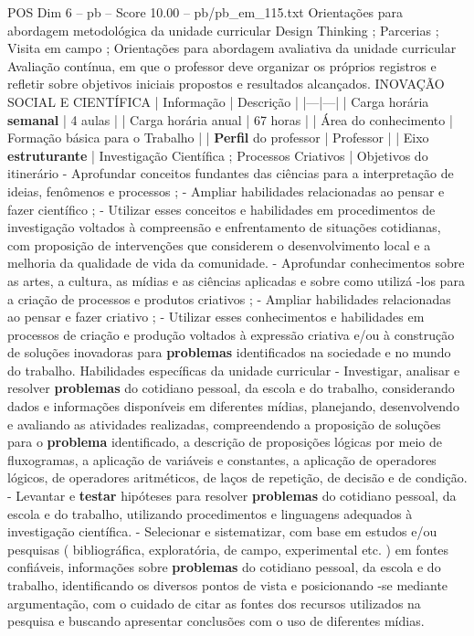 \begin{textsample}{POS Dim 6 – pb – Score 10.00 – pb/pb\_em\_115.txt}
Orientações para abordagem metodológica da unidade curricular Design Thinking ; Parcerias ; Visita em campo ; Orientações para abordagem avaliativa da unidade curricular Avaliação contínua, em que o professor deve organizar os próprios registros e refletir sobre objetivos iniciais propostos e resultados alcançados.
INOVAÇÃO SOCIAL E CIENTÍFICA | Informação | Descrição | |---|---| | Carga horária \textbf{semanal} | 4 aulas | | Carga horária anual | 67 horas | | Área do conhecimento | Formação básica para o Trabalho | | \textbf{Perfil} do professor | Professor | | Eixo \textbf{estruturante} | Investigação Científica ; Processos Criativos | Objetivos do itinerário - Aprofundar conceitos fundantes das ciências para a interpretação de ideias, fenômenos e processos ; - Ampliar habilidades relacionadas ao pensar e fazer científico ; - Utilizar esses conceitos e habilidades em procedimentos de investigação voltados à compreensão e enfrentamento de situações cotidianas, com proposição de intervenções que considerem o desenvolvimento local e a melhoria da qualidade de vida da comunidade. - Aprofundar conhecimentos sobre as artes, a cultura, as mídias e as ciências aplicadas e sobre como utilizá -los para a criação de processos e produtos criativos ; - Ampliar habilidades relacionadas ao pensar e fazer criativo ; - Utilizar esses conhecimentos e habilidades em processos de criação e produção voltados à expressão criativa e/ou à construção de soluções inovadoras para \textbf{problemas} identificados na sociedade e no mundo do trabalho.
Habilidades específicas da unidade curricular - Investigar, analisar e resolver \textbf{problemas} do cotidiano pessoal, da escola e do trabalho, considerando dados e informações disponíveis em diferentes mídias, planejando, desenvolvendo e avaliando as atividades realizadas, compreendendo a proposição de soluções para o \textbf{problema} identificado, a descrição de proposições lógicas por meio de fluxogramas, a aplicação de variáveis e constantes, a aplicação de operadores lógicos, de operadores aritméticos, de laços de repetição, de decisão e de condição. - Levantar e \textbf{testar} hipóteses para resolver \textbf{problemas} do cotidiano pessoal, da escola e do trabalho, utilizando procedimentos e linguagens adequados à investigação científica. - Selecionar e sistematizar, com base em estudos e/ou pesquisas ( bibliográfica, exploratória, de campo, experimental etc. ) em fontes confiáveis, informações sobre \textbf{problemas} do cotidiano pessoal, da escola e do trabalho, identificando os diversos pontos de vista e posicionando -se mediante argumentação, com o cuidado de citar as fontes dos recursos utilizados na pesquisa e buscando apresentar conclusões com o uso de diferentes mídias.

\end{textsample}
